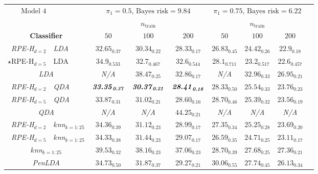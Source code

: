 \documentclass{amsart}
\providecommand{\tabularnewline}{\\}
\begin{document}
\begin{table}[p]
	\small
	\begin{centering}
		\begin{tabular}{r|l|c|c|c|c|c|c|c}
			\multicolumn{1}{r}{$\boxed{\text{Model 4}}$} & \multicolumn{1}{l}{} & \multicolumn{3}{c}{$\pi_{1}=0.5$, $\text{Bayes risk}=9.84$} & \multicolumn{3}{c}{$\pi_{1}=0.75$, $\text{Bayes risk}=6.22$} & \tabularnewline
			\multicolumn{1}{r}{} &  & \multicolumn{3}{c|}{$n_{\mathrm{train}}$} & \multicolumn{3}{c|}{$n_{\mathrm{train}}$} & \tabularnewline
			\multicolumn{2}{c|}{\textbf{Classifier}} & $50$ & $100$ & $200$ & $50$ & $100$ & $200$ & \tabularnewline
			\hline 
			\emph{RPE-H$_{d=2}$} & \emph{LDA} & $\mathit{32.65_{0.37}}$ & $\mathit{30.34_{0.22}}$ & $\mathit{28.33_{0.17}}$ & $\mathit{26.83_{0.45}}$ & $\mathit{24.42_{0.26}}$ & $\mathit{22.9_{0.18}}$ & \tabularnewline
			\hline 
			$\star$RPE-H$_{d=5}$ & LDA & $34.9_{0.533}$ & $32.7_{0.467}$ & $32.6_{0.544}$ & $28.1_{0.711}$ & $23.2_{0.517}$ & $22.6_{0.457}$ & \tabularnewline
			\hline 
			\multicolumn{2}{c|}{\emph{LDA}} & \emph{N/A} & $\mathit{38.47_{0.25}}$ & $\mathit{32.86_{0.17}}$ & \emph{N/A} & $\mathit{32.96_{0.33}}$ & $\mathit{26.95_{0.21}}$ & \tabularnewline
			\hline 
			\emph{RPE-H$_{d=2}$} & \emph{QDA} & $\mbox{\textbf{\emph{33.35}}}_{\text{\textbf{\emph{0.37}}}}$ & $\mbox{\textbf{\emph{30.37}}}_{\text{\textbf{\emph{0.21}}}}$ & $\mbox{\textbf{\emph{28.41}}}_{\text{\textbf{\emph{0.18}}}}$ & $\mathit{28.33_{0.50}}$ & $\mathit{25.54_{0.33}}$ & $\mathit{23.76_{0.23}}$ & \tabularnewline
			\hline 
			\emph{RPE-H$_{d=5}$} & \emph{QDA} & $\mathit{33.87_{0.31}}$ & $\mathit{31.02_{0.21}}$ & $\mathit{28.60_{0.16}}$ & $\mathit{28.70_{0.46}}$ & $\mathit{25.39_{0.32}}$ & $\mathit{23.56_{0.19}}$ & \tabularnewline
			\hline 
			\multicolumn{2}{c|}{\emph{QDA}} & \emph{N/A} & \emph{N/A} & $\mathit{44.25_{0.21}}$ & \emph{N/A} & \emph{N/A} & \emph{N/A} & \tabularnewline
			\hline 
			\emph{RPE-H$_{d=2}$} & \emph{$k$nn$_{k=1:25}$} & $\mathit{34.36_{0.39}}$ & $\mathit{31.12_{0.23}}$ & $\mathit{28.99_{0.17}}$ & $\mathit{27.35_{0.34}}$ & $\mathit{25.25_{0.28}}$ & $\mathit{23.69_{0.20}}$ & \tabularnewline
			\hline 
			\emph{RPE-H$_{d=5}$} & \emph{$k$nn$_{k=1:25}$} & $\mathit{34.33_{0.38}}$ & $\mathit{31.44_{0.23}}$ & $\mathit{29.07_{0.17}}$ & $\mathit{26.59_{0.35}}$ & $\mathit{24.71_{0.25}}$ & $\mathit{23.11_{0.17}}$ & \tabularnewline
			\hline 
			\multicolumn{2}{c|}{\emph{$k$nn$_{k=1:25}$}} & $\mathit{39.53_{0.32}}$ & $\mathit{38.16_{0.23}}$ & $\mathit{37.06_{0.23}}$ & $\mathit{28.70_{0.39}}$ & $\mathit{27.68_{0.25}}$ & $\mathit{27.36_{0.21}}$ & \tabularnewline
			\hline 
			\hline 
			\multicolumn{2}{c|}{\emph{PenLDA}} & $\mathit{34.73_{0.50}}$ & $\mathit{31.87_{0.37}}$ & $\mathit{29.27_{0.21}}$ & $\mathit{30.06_{0.55}}$ & $\mathit{27.74_{0.45}}$ & $\mathit{26.13_{0.34}}$ & \tabularnewline

\end{tabular}
\end{centering}
\end{table}
\end{document}
